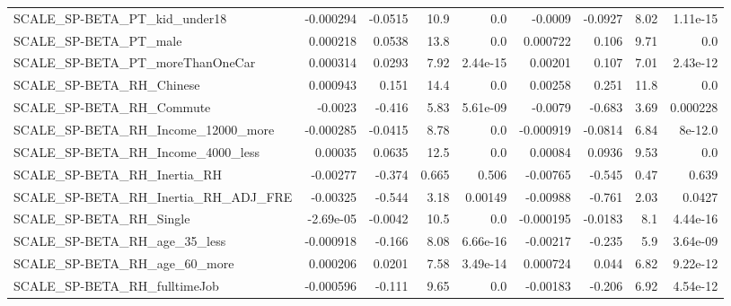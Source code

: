 \begin{tabular}{lrrrrrrrr}
SCALE\_SP-BETA\_PT\_kid\_under18                       &   -0.000294 &      -0.0515 &     10.9 &      0.0 &    -0.0009 &     -0.0927 &         8.02 &      1.11e-15 \\
SCALE\_SP-BETA\_PT\_male                              &    0.000218 &       0.0538 &     13.8 &      0.0 &   0.000722 &       0.106 &         9.71 &           0.0 \\
SCALE\_SP-BETA\_PT\_moreThanOneCar                    &    0.000314 &       0.0293 &     7.92 & 2.44e-15 &    0.00201 &       0.107 &         7.01 &      2.43e-12 \\
SCALE\_SP-BETA\_RH\_Chinese                           &    0.000943 &        0.151 &     14.4 &      0.0 &    0.00258 &       0.251 &         11.8 &           0.0 \\
SCALE\_SP-BETA\_RH\_Commute                           &     -0.0023 &       -0.416 &     5.83 & 5.61e-09 &    -0.0079 &      -0.683 &         3.69 &      0.000228 \\
SCALE\_SP-BETA\_RH\_Income\_12000\_more                 &   -0.000285 &      -0.0415 &     8.78 &      0.0 &  -0.000919 &     -0.0814 &         6.84 &       8e-12.0 \\
SCALE\_SP-BETA\_RH\_Income\_4000\_less                  &     0.00035 &       0.0635 &     12.5 &      0.0 &    0.00084 &      0.0936 &         9.53 &           0.0 \\
SCALE\_SP-BETA\_RH\_Inertia\_RH                        &    -0.00277 &       -0.374 &    0.665 &    0.506 &   -0.00765 &      -0.545 &         0.47 &         0.639 \\
SCALE\_SP-BETA\_RH\_Inertia\_RH\_ADJ\_FRE                &    -0.00325 &       -0.544 &     3.18 &  0.00149 &   -0.00988 &      -0.761 &         2.03 &        0.0427 \\
SCALE\_SP-BETA\_RH\_Single                            &   -2.69e-05 &      -0.0042 &     10.5 &      0.0 &  -0.000195 &     -0.0183 &          8.1 &      4.44e-16 \\
SCALE\_SP-BETA\_RH\_age\_35\_less                       &   -0.000918 &       -0.166 &     8.08 & 6.66e-16 &   -0.00217 &      -0.235 &          5.9 &      3.64e-09 \\
SCALE\_SP-BETA\_RH\_age\_60\_more                       &    0.000206 &       0.0201 &     7.58 & 3.49e-14 &   0.000724 &       0.044 &         6.82 &      9.22e-12 \\
SCALE\_SP-BETA\_RH\_fulltimeJob                       &   -0.000596 &       -0.111 &     9.65 &      0.0 &   -0.00183 &      -0.206 &         6.92 &      4.54e-12 \\

\end{tabular}
